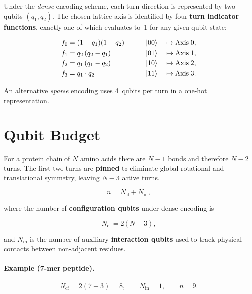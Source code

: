 \documentclass[11pt,a4paper]{article}
\begin{document}
Under the \emph{dense} encoding scheme, each turn direction is represented by
two qubits $(q_1, q_2)$. The chosen lattice axis is identified by four
\textbf{turn indicator functions}, exactly one of which evaluates to~1 for any
given qubit state:

\begin{alignat}{3}
  f_0 &= (1-q_1)(1-q_2) &\qquad& \ket{00} &\;\mapsto\;& \text{Axis } 0, \\
  f_1 &= q_2\,(q_2-q_1)  &\qquad& \ket{01} &\;\mapsto\;& \text{Axis } 1, \\
  f_2 &= q_1\,(q_1-q_2)  &\qquad& \ket{10} &\;\mapsto\;& \text{Axis } 2, \\
  f_3 &= q_1 \cdot q_2    &\qquad& \ket{11} &\;\mapsto\;& \text{Axis } 3.
\end{alignat}

An alternative \emph{sparse} encoding uses 4~qubits per turn in a one-hot
representation.

\section{Qubit Budget}

For a protein chain of $N$ amino acids there are $N-1$ bonds and therefore
$N-2$ turns. The first two turns are \textbf{pinned} to eliminate global
rotational and translational symmetry, leaving $N-3$ active turns.

\begin{equation}
  n = N_{\mathrm{cf}} + N_{\mathrm{in}},
\end{equation}

where the number of \textbf{configuration qubits} under dense encoding is

\begin{equation}
  N_{\mathrm{cf}} = 2(N-3),
\end{equation}

and $N_{\mathrm{in}}$ is the number of auxiliary \textbf{interaction qubits}
used to track physical contacts between non-adjacent residues.

\paragraph{Example (7-mer peptide).}
\begin{equation}
  N_{\mathrm{cf}} = 2(7-3) = 8, \qquad
  N_{\mathrm{in}} = 1, \qquad
  n = 9.
\end{equation}
\end{document}
